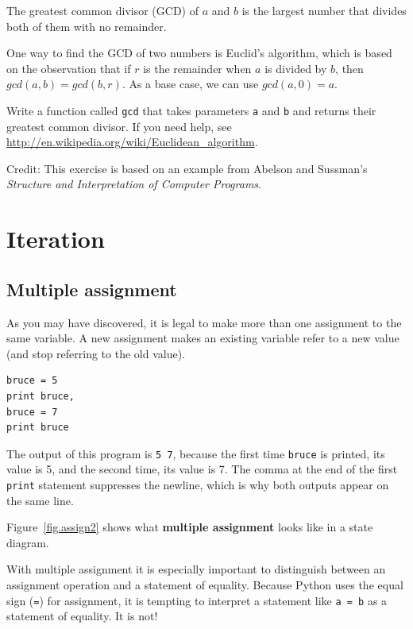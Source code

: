 \documentclass[10pt]{book}
\begin{document}
\begin{CJK}{UTF8}{gbsn}
\begin{exercise}

The greatest common divisor (GCD) of $a$ and $b$ is the largest number
that divides both of them with no remainder.  

One way to find the GCD of two numbers is Euclid's algorithm,
which is based on the observation that if $r$ is the remainder
when $a$ is divided by $b$, then $gcd(a, b) = gcd(b, r)$.
As a base case, we can use $gcd(a, 0) = a$.

Write a function called
\verb"gcd" that takes parameters {\tt a} and {\tt b}
and returns their greatest common divisor.  If you need
help, see \url{http://en.wikipedia.org/wiki/Euclidean_algorithm}.

Credit: This exercise is based on an example from Abelson and
Sussman's {\em Structure and Interpretation of Computer Programs}.

\end{exercise}


\chapter{Iteration}

\section{Multiple assignment}

As you may have discovered, it is legal to
make more than one assignment to the same variable.  A
new assignment makes an existing variable refer to a new
value (and stop referring to the old value).

\begin{verbatim}
bruce = 5
print bruce,
bruce = 7
print bruce
\end{verbatim}
%
The output of this program is {\tt 5 7}, because the first time
{\tt bruce} is printed, its value is 5, and the second time, its
value is 7.  The
comma at the end of the first {\tt print} statement suppresses
the newline, which is why both outputs
appear on the same line.

Figure~\ref{fig.assign2} shows what {\bf multiple assignment} looks
like in a state diagram.  

With multiple assignment it is especially important to distinguish
between an assignment operation and a statement of equality.  Because
Python uses the equal sign ({\tt =}) for assignment, it is tempting to
interpret a statement like {\tt a = b} as a statement of equality. It
is not!


\end{CJK}
\end{document}
